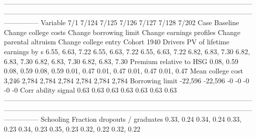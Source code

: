 ---------------------------------------------------------------------------------------------------------------------------------------------------------------------------------------------------------------------------------------
                              Variable                          7/1                        7/124                    7/125                     7/126                       7/127                       7/128                       7/202
                                  Case                     Baseline         Change college costs   Change borrowing limit  Change earnings profiles    Change parental altruism        Change college entry                 Cohort 1940
                               Drivers                                                                                                                                                                                                 
          PV of lifetime earnings by s             6.55, 6.63, 7.22             6.55, 6.63, 7.22         6.55, 6.63, 7.22          6.82, 6.83, 7.30            6.82, 6.83, 7.30            6.82, 6.83, 7.30            6.82, 6.83, 7.30
               Premium relative to HSG                   0.08, 0.59                   0.08, 0.59               0.08, 0.59                0.01, 0.47                  0.01, 0.47                  0.01, 0.47                  0.01, 0.47
                     Mean college cost                        3,246                        2,784                    2,784                     2,784                       2,784                       2,784                       2,784
                       Borrowing limit                      -22,596                      -22,596                       -0                        -0                          -0                          -0                          -0
                   Corr ability signal                         0.63                         0.63                     0.63                      0.63                        0.63                        0.63                        0.63
---------------------------------------------------------------------------------------------------------------------------------------------------------------------------------------------------------------------------------------
                             Schooling                                                                                                                                                                                                 
         Fraction dropouts / graduates                   0.33, 0.24                   0.34, 0.24               0.33, 0.23                0.34, 0.23                  0.35, 0.23                  0.32, 0.22                  0.32, 0.22
